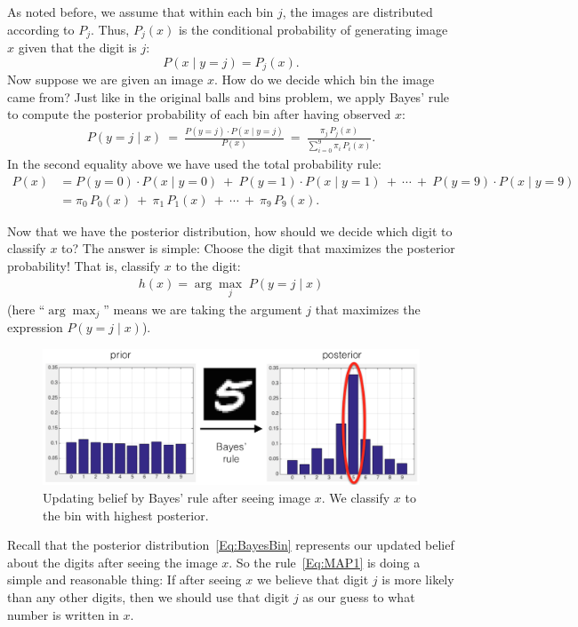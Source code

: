 \documentclass[11pt]{article}
\begin{document}
As noted before, we assume that within each bin $j$, the images are distributed according to $P_j$. Thus, $P_j(x)$ is the conditional probability of generating image $x$ given that the digit is $j$:
$$P(x \mid y = j) = P_j(x).$$
Now suppose we are given an image $x$. How do we decide which bin the image came from? Just like in the original balls and bins problem, we apply Bayes' rule to compute the posterior probability of each bin after having observed $x$:
\begin{align}\label{Eq:BayesBin}
P(y = j \mid x) ~=~ \frac{P(y = j) \cdot P(x \mid y = j)}{P(x)} ~=~ \frac{\pi_j \, P_j(x)}{\sum_{i=0}^9 \pi_i \, P_i(x)}.
\end{align}
In the second equality above we have used the total probability rule:
\begin{align*}
P(x) &= P(y = 0) \cdot P(x \mid y = 0) \:+\: P(y = 1) \cdot P(x \mid y = 1) \:+\: \cdots \:+\: P(y = 9) \cdot P(x \mid y = 9) \\
&= \pi_0 \, P_0(x) \:+\: \pi_1 \, P_1(x) \:+\: \cdots \:+\: \pi_9 \, P_9(x).
\end{align*}

Now that we have the posterior distribution, how should we decide which digit to classify $x$ to? The answer is simple: Choose the digit that maximizes the posterior probability! That is, classify $x$ to the digit:
\begin{align}\label{Eq:MAP1}
h(x) = \arg\max_j \; P(y = j \mid x)
\end{align}
(here ``$\arg \max_j$'' means we are taking the argument $j$ that maximizes the expression $P(y = j \mid x)$).

\begin{figure}[h!]
\centering
\includegraphics[scale=0.55]{priorposterior}
\caption{Updating belief by Bayes' rule after seeing image $x$. We classify $x$ to the bin with highest posterior.}
\label{fig:priorposterior}
\end{figure}

Recall that the posterior distribution~\eqref{Eq:BayesBin} represents our updated belief about the digits after seeing the image $x$. So the rule~\eqref{Eq:MAP1} is doing a simple and reasonable thing: If after seeing $x$ we believe that digit $j$ is more likely than any other digits, then we should use that digit $j$ as our guess to what number is written in $x$.
\end{document}
